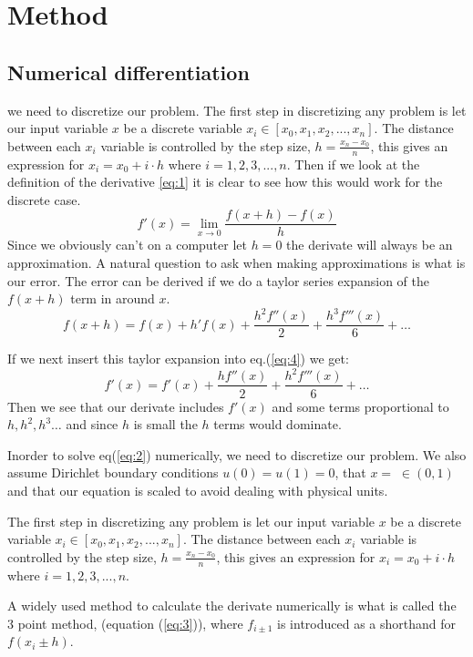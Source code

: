 \section*{Method}
\subsection*{Numerical differentiation}
we need to discretize our problem.
The first  step in discretizing any problem is let our input variable $x$ be a discrete variable $x_i \in \left[x_0, x_1, x_2, ..., x_n \right]$. The distance between each $x_i$ variable is controlled by the step size, $h = \frac{x_n -x_0}{n}$, this gives an expression for $x_i = x_0 + i\cdot h$ where $i = 1,2,3, ..., n$. Then if we look at the definition of the derivative \ref{eq:1} it is clear to see how this would work for the discrete case.    
\begin{equation}\label{eq:1}
    f'(x) = \lim_{x\to 0} \frac{f(x+h)-f(x)}{h}
\end{equation}\label{eq:1} 
Since we obviously can't on a computer let $h = 0$ the derivate will always be an approximation. A natural question to ask when making approximations is what is our error. The error can be derived if we do a taylor series expansion of the $f(x+h)$ term in around $x$.
\begin{equation}\label{eq:4}
    f(x+h) = f(x) + h'f(x) + \frac{h^2f''(x)}{2} + \frac{h^3f'''(x)}{6} + \dots    
\end{equation}   

If we next insert this taylor expansion into eq.(\ref{eq:4}) we get:
\begin{equation}
  f'(x) = f'(x) + \frac{h f''(x)}{2} + \frac{h^2f'''(x)}{6} + \dots
\end{equation} 
Then we see that our derivate includes $f'(x)$ and some terms proportional to $h, h^2, h^3 \dots $ and since $h$ is small the $h$ terms would dominate.   
\par
Inorder to solve eq(\ref{eq:2}) numerically, we need to discretize our problem. We also assume Dirichlet boundary conditions $u(0) = u(1) = 0$, that $x = \; \in (0,1)$ and that our equation is scaled to avoid dealing with physical units. \par The first step in discretizing any problem is let our input variable $x$ be a discrete variable $x_i \in \left[x_0, x_1, x_2, ..., x_n \right]$. The distance between each $x_i$ variable is controlled by the step size, $h = \frac{x_n -x_0}{n}$, this gives an expression for $x_i = x_0 + i\cdot h$ where $i = 1,2,3, ..., n$. 
\par A widely used method to calculate the derivate numerically is what is called the 3 point method, (equation (\ref{eq:3})), where $f_{i \pm 1}$ is introduced as a shorthand for $ f(x_i \pm h)$.   

